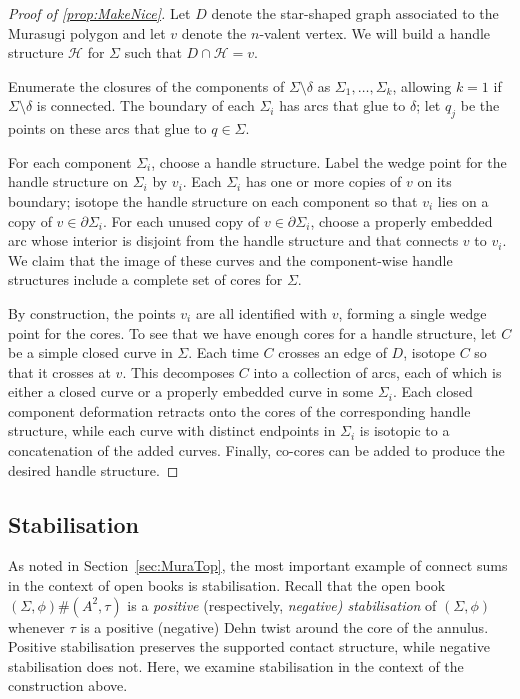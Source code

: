 \documentclass{amsart}
\theoremstyle{definition}
\def\H{\mathcal{H}}
\begin{document}
\begin{proof}[Proof of \ref{prop:MakeNice}]
Let  $D$ denote the star-shaped graph associated to the Murasugi polygon and let $v$ denote the $n$-valent vertex.   We will build a handle structure $\H$ for $\Sigma$ such that   $D\cap\H=v$. 
    
    Enumerate the closures of the components of $\Sigma\setminus\delta$  as $\Sigma_{1},\dots,\Sigma_{k}$, allowing $k=1$ if $\Sigma\setminus\delta$ is  connected. The boundary of each $\Sigma_{i}$ has arcs that glue to $\delta$; let $q_j$ be the points on these arcs that glue to $q\in\Sigma$.
    
   For each component $\Sigma_i$, choose a handle structure.  Label the wedge point for the handle structure on $\Sigma_i$  by $v_i$.  Each $\Sigma_i$ has one or more copies of $v$ on its boundary; isotope the handle structure on each component so that $v_i$ lies on a copy of $v\in \partial \Sigma_i$.  For each unused copy of $v\in \partial \Sigma_i$, choose a properly embedded arc whose interior is disjoint from the handle structure and that connects $v$ to $v_i$.  We claim that the image of these curves and the component-wise handle structures include a complete set of cores for $\Sigma$.
      
 By construction, the points $v_i$ are all identified with $v$, forming a single wedge point for the cores.  To see that we have enough cores for a handle structure, let $C$ be a simple closed curve in $\Sigma$.  Each time $C$ crosses an edge of $D$, isotope $C$ so that it crosses at $v$.  This decomposes $C$ into a collection of arcs, each of which is either a closed curve or a properly embedded curve in some $\Sigma_i$.  Each closed component deformation retracts onto the cores of the corresponding handle structure, while each curve with distinct endpoints in $\Sigma_i$ is isotopic to a concatenation of the added curves.  Finally, co-cores can be added to produce the desired handle structure.  
 \end{proof}



\subsection{Stabilisation}\label{sec:stab}
As noted in Section~\ref{sec:MuraTop},  the most important example of connect sums in the context of open books is stabilisation.  Recall that the open book $(\Sigma, \phi) \# (A^2, \tau)$ is a \emph{positive} (respectively, \emph{negative) stabilisation} of $(\Sigma,\phi)$ whenever $\tau$ is a positive (negative) Dehn twist around the core of the annulus.  Positive stabilisation preserves the supported contact structure, while negative stabilisation does not.  Here, we examine stabilisation in the context of the construction above. 
\end{document}
